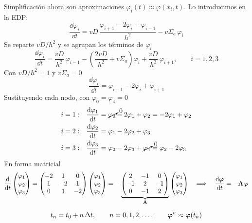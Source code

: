 Simplificación
ahora son aproximaciones
$\varphi_i(t) \approx \varphi(x_i, t)$. Lo introducimos en la EDP:
\[
  \frac{\dd\varphi_i}{\dd t} = vD\,\frac{\varphi_{i+1} - 2\varphi_i + \varphi_{i-1}}{h^2} - v\Sigma_a\, \varphi_i
\]
Se reparte $vD/h^2$ y se agrupan los términos de $\varphi_i$
\[
  \frac{\dd\varphi_i}{\dd t}
  = \frac{vD}{h^2}\, \varphi_{i-1} - \left(\frac{2vD}{h^2} + v\Sigma_a\right) \varphi_i
     + \frac{vD}{h^2}\, \varphi_{i+1}, \qquad i = 1, 2, 3
\]
Con $vD/h^2 = 1$ y $v\Sigma_a = 0$
\[
  \frac{\dd\varphi_i}{\dd t} = \varphi_{i-1} - 2\varphi_i + \varphi_{i+1}
\]
Sustituyendo cada nodo, con $\varphi_0 = \varphi_4 = 0$
\begin{align*}
  i = 1:&\quad \frac{\mathrm{d}\varphi_1}{\mathrm{d} t} = \cancelto{0}{\varphi_0} - 2\varphi_1 + \varphi_2 = -2\varphi_1 + \varphi_2\\
  i = 2:&\quad \frac{\mathrm{d}\varphi_2}{\mathrm{d} t} = \varphi_1 - 2\varphi_2 + \varphi_3\\
  i = 3:&\quad \frac{\mathrm{d}\varphi_3}{\mathrm{d} t} = \varphi_2 - 2\varphi_3 + \cancelto{0}{\varphi_4} = \varphi_2 - 2\varphi_3
\end{align*}
En forma matricial
\[
  \frac{\mathrm{d}}{\mathrm{d} t}\begin{pmatrix} \varphi_1\\ \varphi_2\\ \varphi_3 \end{pmatrix}
  = \begin{pmatrix} -2 & 1 & 0\\ 1 & -2 & 1\\ 0 & 1 & -2 \end{pmatrix}
    \begin{pmatrix} \varphi_1\\ \varphi_2\\ \varphi_3 \end{pmatrix}
  = -\underbrace{\begin{pmatrix} 2 & -1 & 0\\ -1 & 2 & -1\\ 0 & -1 & 2 \end{pmatrix}}_{\mathbf{A}}
    \begin{pmatrix} \varphi_1\\ \varphi_2\\ \varphi_3 \end{pmatrix}
  \quad\Longrightarrow\quad
  \frac{\mathrm{d}\bm{\varphi}}{\mathrm{d} t} = -\mathbf{A}\bm{\varphi} 
\]

\[
  t_n = t_0 + n\,\Delta t, \qquad n = 0, 1, 2, \dots, \qquad
  \bm{\varphi}^{n} \approx \bm{\varphi}(t_n) 
\]

